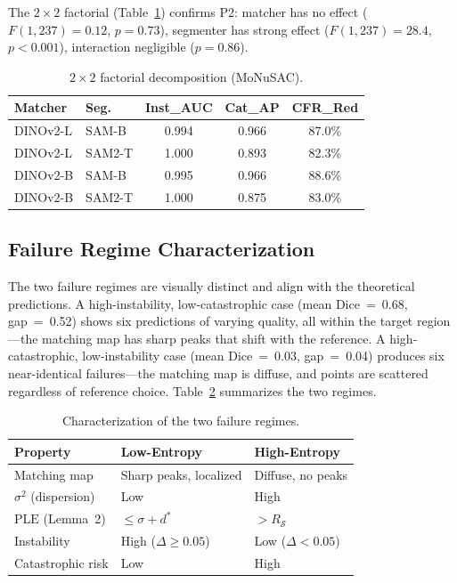 \documentclass[10pt,twocolumn,letterpaper]{article}
\begin{document}
The $2\times 2$ factorial (Table~\ref{tab:wp4}) confirms P2: matcher has no
effect ($F(1,237)=0.12$, $p=0.73$), segmenter has strong effect
($F(1,237)=28.4$, $p<0.001$), interaction negligible ($p=0.86$).

\begin{table}[t]
\centering
\caption{$2\times 2$ factorial decomposition (MoNuSAC).}
\label{tab:wp4}
\small
\begin{tabular}{llccc}
\toprule
\textbf{Matcher} & \textbf{Seg.} & \textbf{Inst\_AUC} & \textbf{Cat\_AP} & \textbf{CFR\_Red}\\
\midrule
DINOv2-L & SAM-B   & 0.994 & 0.966 & 87.0\%\\
DINOv2-L & SAM2-T  & 1.000 & 0.893 & 82.3\%\\
DINOv2-B & SAM-B   & 0.995 & 0.966 & 88.6\%\\
DINOv2-B & SAM2-T  & 1.000 & 0.875 & 83.0\%\\
\bottomrule
\end{tabular}
\end{table}

\subsection{Failure Regime Characterization}

The two failure regimes are visually distinct and align with the theoretical
predictions. A high-instability, low-catastrophic case (mean Dice~=~0.68,
gap~=~0.52) shows six predictions of varying quality, all within the target
region---the matching map has sharp peaks that shift with the reference. A
high-catastrophic, low-instability case (mean Dice~=~0.03, gap~=~0.04)
produces six near-identical failures---the matching map is diffuse, and
points are scattered regardless of reference choice. Table~\ref{tab:regimes}
summarizes the two regimes.

\begin{table}[t]
\centering
\caption{Characterization of the two failure regimes.}
\label{tab:regimes}
\small
\begin{tabular}{p{1.8cm}p{2.2cm}p{2.2cm}}
\toprule
\textbf{Property} & \textbf{Low-Entropy} & \textbf{High-Entropy}\\
\midrule
Matching map & Sharp peaks, localized & Diffuse, no peaks\\
$\sigma^2$ (dispersion) & Low & High\\
$\text{PLE}$ (Lemma~2) & $\leq \sigma + d^*$ & $> R_{\mathcal{S}}$\\
Instability & High ($\Delta \geq 0.05$) & Low ($\Delta < 0.05$)\\
Catastrophic risk & Low & High\\
\bottomrule
\end{tabular}
\end{table}
\end{document}

